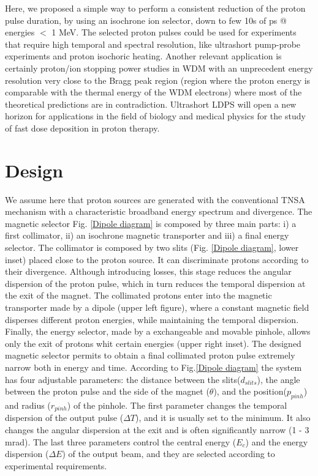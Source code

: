 \documentclass{cup-hpl}
\begin{document}
Here, we proposed a simple way to perform a consistent reduction of the proton pulse duration, by using an isochrone ion selector, down to few 10s of ps @ energies $<$ 1 MeV. The selected proton pulses could be used for experiments that require high temporal and spectral resolution, like ultrashort pump-probe experiments and proton isochoric heating. Another relevant application is certainly proton/ion stopping power studies in WDM  with an unprecedent energy resolution very close to the Bragg peak region (region where the proton energy is comparable with the thermal energy of the WDM electrons) where most of the theoretical predictions are in contradiction. Ultrashort LDPS will open a new horizon for applications in the field of biology and medical physics for the study of fast dose deposition in proton therapy. 
\section{Design}
We assume here that proton sources are generated with the conventional TNSA mechanism with a characteristic broadband energy spectrum and divergence. The magnetic selector Fig. \ref{Dipole diagram} is composed by three main parts: i) a first collimator, ii) an isochrone magnetic transporter and iii) a final energy selector. 
The collimator is composed by two slits (Fig. \ref{Dipole diagram}, lower inset) placed close to the proton source. It can discriminate protons according to their divergence. Although introducing losses, this stage reduces the angular dispersion of the proton pulse, which in turn reduces the temporal dispersion at the exit of the magnet. The collimated protons enter into the magnetic transporter made by a dipole (upper left figure), where a constant magnetic field disperses different proton energies, while maintaining the temporal dispersion. Finally, the energy selector, made by a exchangeable and movable pinhole, allows only the exit of protons whit certain energies (upper right inset). The designed magnetic selector permits to obtain a final collimated proton pulse extremely narrow both in energy and time.
According to Fig.\ref{Dipole diagram} the system has four adjustable parameters: the distance between the slits($d_{slits}$), the angle between the proton pulse and the side of the magnet ($\theta$), and the position($p_{pinh}$) and radius ($r_{pinh}$) of the pinhole. The first parameter changes the temporal dispersion of the output pulse ($\Delta T$), and it is usually set to the minimum. It also changes the angular dispersion at the exit and is often significantly narrow (1 - 3 mrad). The last three parameters control the central energy ($E_c$) and the energy dispersion ($\Delta E$) of the output beam, and they are selected according to experimental requirements.
\end{document}
